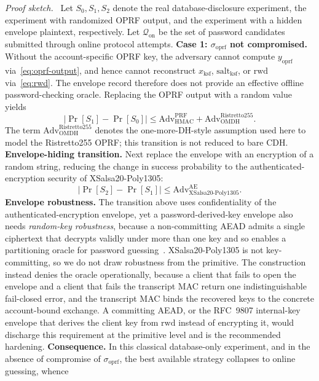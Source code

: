 \documentclass{ieeeijc}
\newcommand{\sigoprf}{\sigma_{\mathrm{oprf}}}
\theoremstyle{remark}
\newenvironment{sketchproof}{\par\noindent\textit{Proof sketch.}\ }{\par}
\begin{document}
\begin{sketchproof}
Let $S_0,S_1,S_2$ denote the real database-disclosure experiment, the
experiment with randomized OPRF output, and the experiment with a hidden
envelope plaintext, respectively. Let $\mathcal{Q}_{\mathrm{on}}$ be the
set of password candidates submitted through online protocol attempts.
\textbf{Case 1: \textnormal{$\sigoprf$ not compromised.}}
Without the account-specific OPRF key, the adversary cannot compute
$y_{\mathrm{oprf}}$ via~\eqref{eq:oprf-output}, and hence cannot
reconstruct $x_{\mathrm{ksf}}$, $\mathrm{salt}_{\mathrm{ksf}}$, or
$\mathrm{rwd}$ via~\eqref{eq:rwd}. The envelope record therefore does
not provide an effective offline password-checking oracle. Replacing
the OPRF output with a random value yields
\[
  |\Pr[S_1] - \Pr[S_0]| \leq
  \mathrm{Adv}_{\mathrm{HMAC}}^{\mathrm{PRF}} +
  \mathrm{Adv}_{\mathrm{OMDH}}^{\mathrm{Ristretto255}}.
\]
The term $\mathrm{Adv}_{\mathrm{OMDH}}^{\mathrm{Ristretto255}}$ denotes
the one-more-DH-style assumption used here to model the Ristretto255 OPRF;
this transition is not reduced to bare CDH.
\textbf{Envelope-hiding transition.} Next replace the envelope with an
encryption of a random string, reducing the change in success probability
to the authenticated-encryption security of XSalsa20-Poly1305:
\[
  |\Pr[S_2] - \Pr[S_1]| \leq
  \mathrm{Adv}_{\mathrm{XSalsa20\text{-}Poly1305}}^{\mathrm{AE}}.
\]
\textbf{Envelope robustness.} The transition above uses confidentiality of the
authenticated-encryption envelope, yet a password-derived-key envelope also
needs \emph{random-key robustness}, because a non-committing AEAD admits a single
ciphertext that decrypts validly under more than one key and so enables a
partitioning oracle for password guessing~\cite{len2021partitioning}.
XSalsa20-Poly1305 is not key-committing, so we do not draw robustness from the
primitive. The construction instead denies the oracle operationally, because a
client that fails to open the envelope and a client that fails the transcript
MAC return one indistinguishable fail-closed error, and the transcript MAC binds
the recovered keys to the concrete account-bound exchange. A committing AEAD, or
the RFC~9807 internal-key envelope that derives the client key from
$\mathrm{rwd}$ instead of encrypting it, would discharge this requirement at the
primitive level and is the recommended hardening.
\textbf{Consequence.} In this classical database-only experiment, and in
the absence of compromise of $\sigoprf$, the best available strategy
collapses to online guessing, whence
\[
  \begin{aligned}

\end{aligned}\]
\end{sketchproof}
\end{document}
